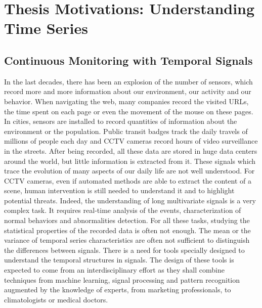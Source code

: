 \documentclass[../thesis.tex]{subfiles}
\begin{document}
\section[Thesis Motivations: Understanding Time Series]{Thesis Motivations: Understanding Time Series%
							}
\label{sec:context}

\subsection{Continuous Monitoring with Temporal Signals}
\label{sub:intro_ts}



In the last decades, there has been an explosion of the number of sensors, which record more and more information about our environment, our activity and our behavior. When navigating the web, many companies record the visited URLs, the time spent on each page or even the movement of the mouse on these pages. In cities, sensors are installed to record quantities of information about the environment or the population. Public transit badges track the daily travels of millions of people each day and CCTV cameras record hours of video surveillance in the streets. After being recorded, all these data are stored in huge data centers around the world, but little information is extracted from it. These signals which trace the evolution of many aspects of our daily life are not well understood. For CCTV cameras, even if automated methods are able to extract the content of a scene, human intervention is still needed to understand it and to highlight potential threats. Indeed, the understanding of long multivariate signals is a very complex task. It requires real-time analysis of the events, characterization of normal behaviors and abnormalities detection. For all these tasks, studying the statistical properties of the recorded data is often not enough. The mean or the variance of temporal series characteristics are often not sufficient to distinguish the differences between signals. There is a need for tools specially designed to understand the temporal structures in signals. The design of these tools is expected to come from an interdisciplinary effort as they shall combine techniques from machine learning, signal processing and pattern recognition augmented by the knowledge of experts, from marketing professionals, to climatologists or medical doctors.
\end{document}
